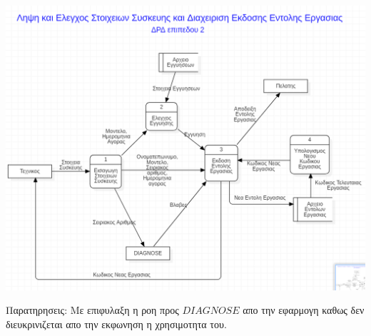 \documentclass[12pt]{article}
\begin{document}
\begin{center}
\includegraphics[scale=0.7]{MerosB/B4}
\end{center}
Παρατηρησεις: Με επιφυλαξη η ροη προς $DIAGNOSE$ απο την εφαρμογη καθως δεν διευκρινιζεται απο την εκφωνηση η χρησιμοτητα του.
\newpage
\end{document}
